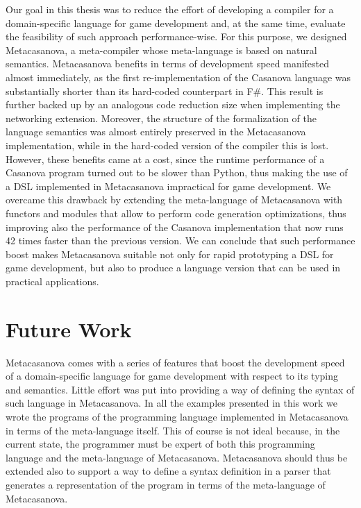 Our goal in this thesis was to reduce the effort of developing a compiler for a domain-specific language for game development and, at the same time, evaluate the feasibility of such approach performance-wise. For this purpose, we designed Metacasanova, a meta-compiler whose meta-language is based on natural semantics. Metacasanova benefits in terms of development speed manifested almost immediately, as the first re-implementation of the Casanova language was substantially shorter than its hard-coded counterpart in F\#. This result is further backed up by an analogous code reduction size when implementing the networking extension. Moreover, the structure of the formalization of the language semantics was almost entirely preserved in the Metacasanova implementation, while in the hard-coded version of the compiler this is lost. However, these benefits came at a cost, since the runtime performance of a Casanova program turned out to be slower than Python, thus making the use of a DSL implemented in Metacasanova impractical for game development. We overcame this drawback by extending the meta-language of Metacasanova with functors and modules that allow to perform code generation optimizations, thus improving also the performance of the Casanova implementation that now runs 42 times faster than the previous version. We can conclude that such performance boost makes Metacasanova suitable not only for rapid prototyping a DSL for game development, but also to produce a language version that can be used in practical applications.

\section{Future Work}
\label{sec:ch_conclusion_future_work}
Metacasanova comes with a series of features that boost the development speed of a domain-specific language for game development with respect to its typing and semantics. Little effort was put into providing a way of defining the syntax of such language in Metacasanova. In all the examples presented in this work we wrote the programs of the programming language implemented in Metacasanova in terms of the meta-language itself. This of course is not ideal because, in the current state, the programmer must be expert of both this programming language and the meta-language of Metacasanova. Metacasanova should thus be extended also to support a way to define a syntax definition in a parser that generates a representation of the program in terms of the meta-language of Metacasanova.


